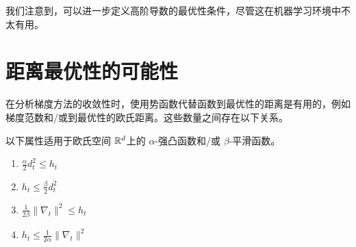 我们注意到，可以进一步定义高阶导数的最优性条件，尽管这在机器学习环境中不太有用。

\section{
    距离最优性的可能性
    }

在分析梯度方法的收敛性时，使用势函数代替函数到最优性的距离是有用的，例如梯度范数和/或到最优性的欧氏距离。这些数量之间存在以下关系。

\begin{lemma} \label{lem:elementary_properties}
以下属性适用于欧氏空间 ${\mathbb R}^d$上的 $\alpha$-强凸函数和/或 $\beta$-平滑函数。
\begin{enumerate}
    \item $\frac{\alpha}{2} d_t^2 \leq h_t$
    \item $ h_t \leq \frac{\beta}{2} d_t^2$
    \item $\frac{1}{2 \beta} \|\nabla_t\|^2 \leq h_t$
    \item $ h_t \leq \frac{1}{2 \alpha} \|\nabla_t\|^2 $
\end{enumerate}
\end{lemma}

